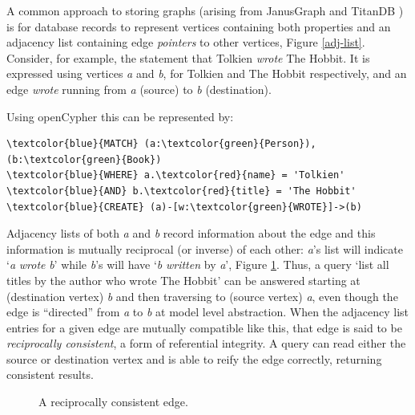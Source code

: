 \documentclass[sigplan,10pt]{acmart}
\begin{document}
A common approach to storing graphs (arising from JanusGraph \cite{janusgraph} and TitanDB \cite{TitanDB}) is for database records to represent vertices containing both properties and an adjacency list containing edge \emph{pointers} to other vertices, Figure \ref{adj-list}. Consider, for example, the statement that Tolkien \textit{wrote} The Hobbit. It is expressed using vertices \emph{a} and \emph{b}, for Tolkien and The Hobbit respectively, and an edge \textit{wrote} running from \emph{a} (source) to \emph{b} (destination).

Using openCypher \cite{openCypher} this can be represented by:
\begin{Verbatim}[commandchars=\\\{\},fontsize=\small,xleftmargin=.2in]
\textcolor{blue}{MATCH} (a:\textcolor{green}{Person}), (b:\textcolor{green}{Book})
\textcolor{blue}{WHERE} a.\textcolor{red}{name} = 'Tolkien' \textcolor{blue}{AND} b.\textcolor{red}{title} = 'The Hobbit'
\textcolor{blue}{CREATE} (a)-[w:\textcolor{green}{WROTE}]->(b)
\end{Verbatim}

Adjacency lists of both \emph{a} and \emph{b} record information about the edge and this information is mutually reciprocal (or inverse) of each other: \emph{a}'s list will indicate `\emph{a} \emph{wrote} \emph{b}' while \emph{b}'s will have `\emph{b} \emph{written} by \emph{a}', Figure \ref{reciprocally-consistent-edge}. Thus, a query `list all titles by the author who wrote The Hobbit' can be answered starting at (destination vertex) \emph{b} and then traversing to (source vertex) \emph{a}, even though the edge is ``directed'' from \emph{a} to \emph{b} at model level abstraction. When the adjacency list entries for a given edge are mutually compatible like this, that edge is said to be \emph{reciprocally consistent}, a form of referential integrity. A query can read either the source or destination vertex and is able to reify the edge correctly, returning consistent results.

\begin{figure}[ht!]
  \centering
  \caption{A reciprocally consistent edge.}
  \label{reciprocally-consistent-edge}
\end{figure}
\end{document}

